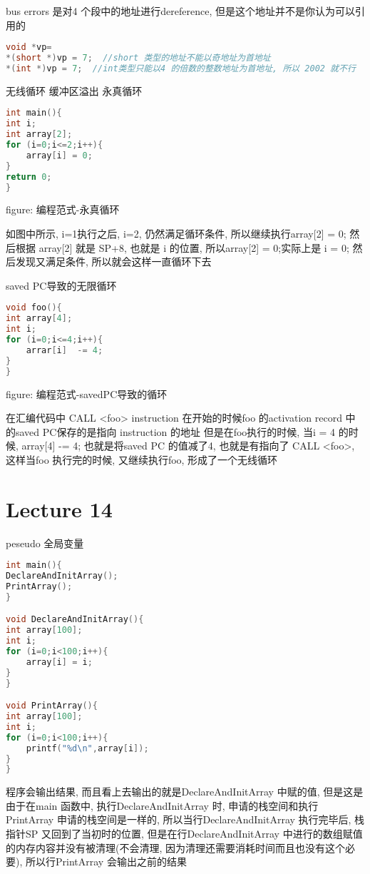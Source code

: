 \documentclass{article}
\begin{document}
bus errors
是对4 个段中的地址进行dereference, 但是这个地址并不是你认为可以引用的
\begin{lstlisting}[language = C]
void *vp= 
*(short *)vp = 7;  //short 类型的地址不能以奇地址为首地址
*(int *)vp = 7;  //int类型只能以4 的倍数的整数地址为首地址, 所以 2002 就不行
\end{lstlisting}
无线循环 缓冲区溢出
永真循环
\begin{lstlisting}[language = C]
int main(){
int i;
int array[2];
for (i=0;i<=2;i++){
	array[i] = 0;
}
return 0;
}
\end{lstlisting}
figure: 编程范式-永真循环
 
如图中所示, i=1执行之后, i=2, 仍然满足循环条件, 所以继续执行array[2] = 0;
然后根据 array[2] 就是 SP+8, 也就是 i 的位置, 所以array[2] = 0;实际上是 i = 0; 然后发现又满足条件, 所以就会这样一直循环下去

saved PC导致的无限循环
\begin{lstlisting}[language = C]
void foo(){
int array[4];
int i;
for (i=0;i<=4;i++){
	arrar[i]  -= 4;
}
}
\end{lstlisting}
figure: 编程范式-savedPC导致的循环
 

在汇编代码中
CALL <foo>
instruction
在开始的时候foo 的activation record 中的saved PC保存的是指向 instruction 的地址
但是在foo执行的时候, 当i = 4 的时候, array[4] -= 4; 也就是将saved PC 的值减了4, 也就是有指向了 CALL <foo>, 这样当foo 执行完的时候, 又继续执行foo, 形成了一个无线循环

\section{Lecture 14}
peseudo 全局变量
\begin{lstlisting}[language = C]
int main(){
DeclareAndInitArray();
PrintArray();
}

void DeclareAndInitArray(){
int array[100];
int i;
for (i=0;i<100;i++){
	array[i] = i;
}
}

void PrintArray(){
int array[100];
int i;
for (i=0;i<100;i++){
	printf("%d\n",array[i]);
}
}
\end{lstlisting}
程序会输出结果, 而且看上去输出的就是DeclareAndInitArray 中赋的值, 但是这是由于在main 函数中, 执行DeclareAndInitArray 时, 申请的栈空间和执行PrintArray 申请的栈空间是一样的, 所以当行DeclareAndInitArray 执行完毕后, 栈指针SP 又回到了当初时的位置, 但是在行DeclareAndInitArray 中进行的数组赋值的内存内容并没有被清理(不会清理, 因为清理还需要消耗时间而且也没有这个必要), 所以行PrintArray 会输出之前的结果
\end{document}
